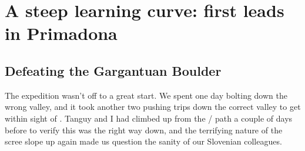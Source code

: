 \section{A steep learning curve: first leads in Primadona}

\subsection{Defeating the Gargantuan Boulder}
The expedition wasn't off to a great start. We spent one day bolting down the wrong valley, and it took another two pushing trips down the correct valley to get within sight of . Tanguy and I had climbed up from the / path a couple of days before to verify this was the right way down, and the terrifying nature of the scree slope up again made us question the sanity of our Slovenian colleagues.

